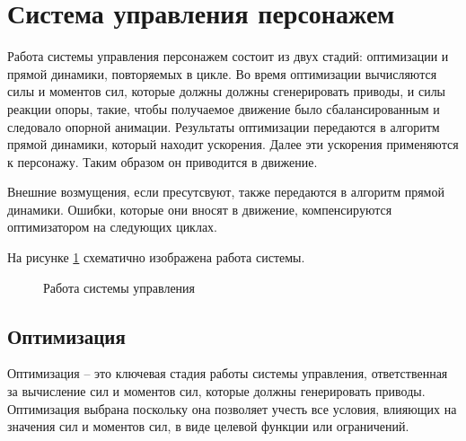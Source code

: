 \section{Система управления персонажем}

Работа системы управления персонажем состоит из двух стадий: оптимизации и прямой динамики, повторяемых в цикле. Во время оптимизации вычисляются силы и моментов сил, которые должны должны сгенерировать приводы, и силы реакции опоры, такие, чтобы получаемое движение было сбалансированным и следовало опорной анимации. Результаты оптимизации передаются в алгоритм прямой динамики, который находит ускорения. Далее эти ускорения применяются к персонажу. Таким образом он приводится в движение.

Внешние возмущения, если пресутсвуют, также передаются в алгоритм прямой динамики. Ошибки, которые они вносят в движение, компенсируются оптимизатором на следующих циклах.

На рисунке \ref{fig:architecture} схематично изображена работа системы.

\begin{figure}[ht]
  \begin{minipage}{\textwidth}
    \centering
    \caption{Работа системы управления}
    \label{fig:architecture}
  \end{minipage}
\end{figure}

\subsection{Оптимизация}

Оптимизация -- это ключевая стадия работы системы управления, ответственная за вычисление сил и моментов сил, которые должны генерировать приводы. Оптимизация выбрана поскольку она позволяет учесть все условия, влияющих на значения сил и моментов сил, в виде целевой функции или ограничений.

